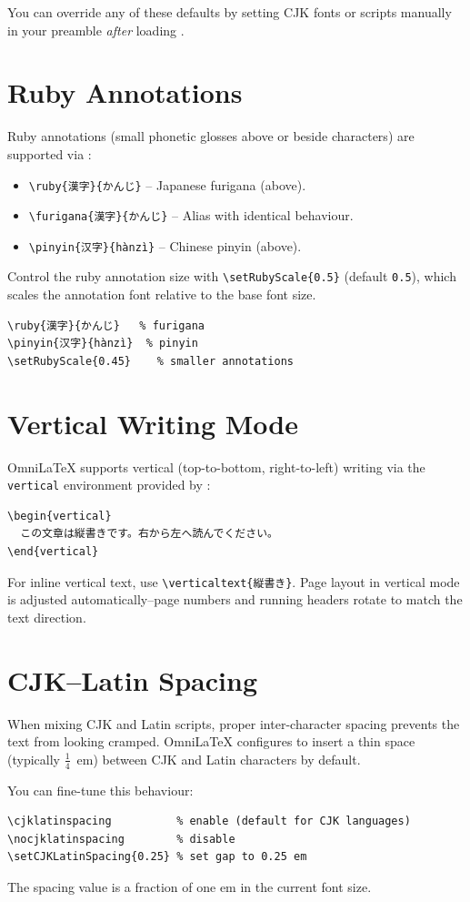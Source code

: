 You can override any of these defaults by setting CJK fonts or scripts
manually in your preamble \emph{after} loading .

\section{Ruby Annotations}

Ruby annotations (small phonetic glosses above or beside characters) are
supported via :

\begin{itemize}
  \item \verb|\ruby{漢字}{かんじ}| -- Japanese furigana (above).
  \item \verb|\furigana{漢字}{かんじ}| -- Alias with identical behaviour.
  \item \verb|\pinyin{汉字}{hànzì}| -- Chinese pinyin (above).
\end{itemize}

Control the ruby annotation size with \verb|\setRubyScale{0.5}| (default
\texttt{0.5}), which scales the annotation font relative to the base font
size.

\begin{verbatim}
\ruby{漢字}{かんじ}   % furigana
\pinyin{汉字}{hànzì}  % pinyin
\setRubyScale{0.45}    % smaller annotations
\end{verbatim}

\section{Vertical Writing Mode}

OmniLaTeX supports vertical (top-to-bottom, right-to-left) writing via the
\texttt{vertical} environment provided by :

\begin{verbatim}
\begin{vertical}
  この文章は縦書きです。右から左へ読んでください。
\end{vertical}
\end{verbatim}

For inline vertical text, use \verb|\verticaltext{縦書き}|.  Page layout in
vertical mode is adjusted automatically--page numbers and running headers
rotate to match the text direction.

\section{CJK--Latin Spacing}

When mixing CJK and Latin scripts, proper inter-character spacing prevents
the text from looking cramped.  OmniLaTeX configures  to
insert a thin space (typically $\tfrac{1}{4}$~em) between CJK and Latin
characters by default.

You can fine-tune this behaviour:

\begin{verbatim}
\cjklatinspacing          % enable (default for CJK languages)
\nocjklatinspacing        % disable
\setCJKLatinSpacing{0.25} % set gap to 0.25 em
\end{verbatim}

The spacing value is a fraction of one em in the current font size.

